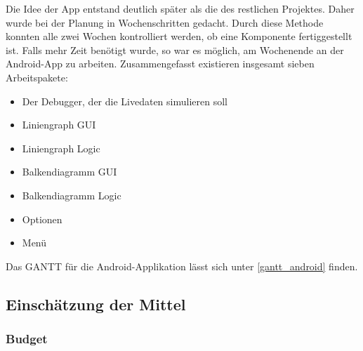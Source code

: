 Die Idee der App entstand deutlich später als die des restlichen Projektes. Daher wurde bei der Planung in Wochenschritten gedacht. Durch diese Methode konnten alle zwei Wochen kontrolliert werden, ob eine Komponente fertiggestellt ist. Falls mehr Zeit benötigt wurde, so war es möglich, am Wochenende an der Android-App zu arbeiten. Zusammengefasst existieren insgesamt sieben Arbeitspakete:
\begin{itemize}
	\item Der Debugger, der die Livedaten simulieren soll
	\item Liniengraph GUI
	\item Liniengraph Logic
	\item Balkendiagramm GUI
	\item Balkendiagramm Logic
	\item Optionen
	\item Menü
\end{itemize}

Das GANTT für die Android-Applikation lässt sich unter \ref{gantt_android} finden.

\subsection{Einschätzung der Mittel}
\subsubsection{Budget}
\label{subsubsec:Budget}

